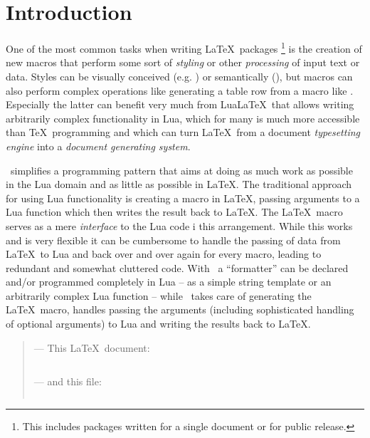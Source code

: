 \documentclass[12pt]{scrartcl}
\begin{document}
\newpage

\tableofcontents

\section{Introduction}

\enlargethispage*{\baselineskip}

One of the most common tasks when writing \LaTeX\ packages%
\footnote{This includes packages written for a single document or for public
	release.} %
is the creation of new macros that perform some sort of \emph{styling} or other
\emph{processing} of input text or data. Styles can be visually conceived (e.g.
\texttt{}) or semantically
(\texttt{}), but macros can also perform complex
operations like generating a table row from a macro like
\texttt{}.  Especially the
latter can benefit very much from Lua\LaTeX\ that allows writing arbitrarily
complex functionality in Lua, which for many is much more accessible than \TeX\
programming and which can turn \LaTeX\ from a document \emph{typesetting engine}
into a \emph{document generating system}.

\luaformatters\ simplifies a programming pattern that aims at doing as much work
as possible in the Lua domain and as little as possible in \LaTeX.  The
traditional approach for using Lua functionality is creating a macro in \LaTeX,
passing arguments to a Lua function which then writes the result back to \LaTeX.
The \LaTeX\ macro serves as a mere \emph{interface} to the Lua code i this
arrangement. While this works and is very flexible it can be cumbersome to
handle the passing of data from \LaTeX\ to Lua and back over and over again for
every macro, leading to redundant and somewhat cluttered code. With
\luaformatters\ a “formatter” can be declared and/or programmed completely in
Lua -- as a simple string template or an arbitrarily complex Lua function --
while \luaformatters\ takes care of generating the \LaTeX\ macro, handles
passing the arguments (including sophisticated handling of optional arguments)
to Lua and writing the results back to \LaTeX.

\begin{quote}

--- This \LaTeX\ document:

\inputminted{tex}{examples/luaformatters-mwe.tex}

\noindent --- and this  file:

\inputminted{lua}{examples/luaformatters-mwe.lua}

\end{quote}
\end{document}
